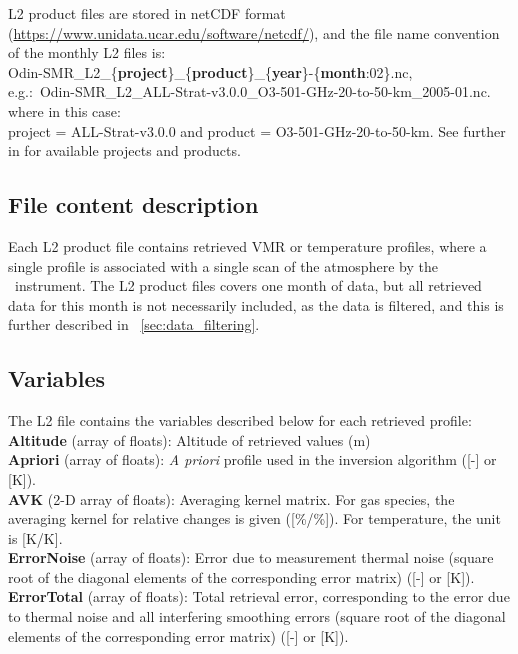 L2 product files are stored in netCDF format
(\url{https://www.unidata.ucar.edu/software/netcdf/}),
and the file name convention of the monthly L2 files is: \\
Odin-SMR\_L2\_\{\textbf{project}\}\_\{\textbf{product}\}\_\{\textbf{year}\}-\{\textbf{month}:02\}.nc, \\
e.g.:\
Odin-SMR\_L2\_ALL-Strat-v3.0.0\_O3-501-GHz-20-to-50-km\_2005-01.nc.\\
where in this case:\\
project = ALL-Strat-v3.0.0 and product = O3-501-GHz-20-to-50-km.
See further in \cite{dds} for available projects and products.


\subsection{File content description}

Each L2 product file contains retrieved VMR or temperature profiles,
where a single profile is associated with a single scan of the atmosphere
by the \smr\ instrument.
The L2 product files covers one month of data, but all retrieved data 
for this month is not necessarily included, as the data is filtered,
and this is further described in ~\ref{sec:data_filtering}.

\subsection*{Variables}

The L2 file contains the variables described below for each retrieved profile: \\

\textbf{Altitude} (array of floats): Altitude of retrieved values (m) \\

\textbf{Apriori} (array of floats): \textit{A priori} profile used in the inversion algorithm ([-] or [K]). \\

\textbf{AVK} (2-D array of floats): Averaging kernel matrix. For gas species, the averaging kernel for relative changes is given ([\%/\%]). For temperature, the unit is [K/K]. \\

\textbf{ErrorNoise} (array of floats): Error due to measurement thermal noise (square root of the diagonal elements of the corresponding error matrix) ([-] or [K]). \\

\textbf{ErrorTotal} (array of floats): Total retrieval error, corresponding to the error due to thermal noise and all interfering smoothing errors (square root of the diagonal elements of the corresponding error matrix) ([-] or [K]). \\

